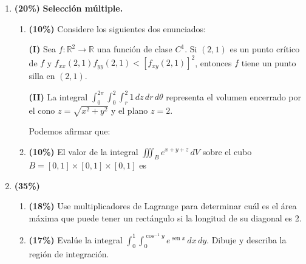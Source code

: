 \documentclass[11pt]{article}
\begin{document}
\begin{enumerate}
\item \textbf{(20\%)} \textbf{Selecci\'on m\'ultiple.}
\begin{enumerate}[label=\alph*)]
\item \textbf{(10\%)} Considere los siguientes dos enunciados:

\textbf{(I)} Sea $f:\mathbb{R}^2\to\mathbb{R}$ una funci\'on de clase $C^1$. Si $(2,1)$ es un punto cr\'itico de $f$ y $f_{xx}(2,1)f_{yy}(2,1) < [f_{xy}(2,1)]^2$, entonces $f$ tiene un punto silla en $(2,1)$.

\textbf{(II)} La integral $\displaystyle\int_0^{2\pi}\int_0^2\int_r^2 1\,dz\,dr\,d\theta$ representa el volumen encerrado por el cono $z=\sqrt{x^2+y^2}$ y el plano $z=2$.

Podemos afirmar que:

\item \textbf{(10\%)} El valor de la integral $\displaystyle\iiint_B e^{x+y+z}\,dV$ sobre el cubo $B=[0,1]\times[0,1]\times[0,1]$ es
\end{enumerate}

\vspace{10pt}
\item \textbf{(35\%)}
\begin{enumerate}[label=\alph*)]
\item \textbf{(18\%)} Use multiplicadores de Lagrange para determinar cu\'al es el \'area m\'axima que puede tener un rect\'angulo si la longitud de su diagonal es 2.
\item \textbf{(17\%)} Eval\'ue la integral $\displaystyle\int_0^1\int_0^{\cos^{-1}y} e^{\operatorname{sen}x}\,dx\,dy$. Dibuje y describa la regi\'on de integraci\'on.
\end{enumerate}
\end{enumerate}
\end{document}
